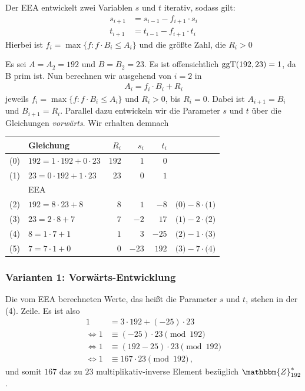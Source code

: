 Der EEA entwickelt zwei Variablen $s$ und $t$ iterativ, sodass gilt: 
    \begin{align*}
      s_{i+1} &= s_{i-1} - f_{i+1} \cdot s_{i}\\
      t_{i+1} &= t_{i-1} - f_{i+1} \cdot t_{i}
    \end{align*}
Hierbei ist $f_i = \max \{f : f \cdot B_i \leq A_i\}$ und die größte
Zahl, die  $R_i > 0$
  \begin{beispiel}[EEA]
    Es sei $A = A_2 = 192 $ und $B = B_2 = 23$. Es ist offensichtlich $\operatorname{ggT}(192, 23) = 1$, da B prim ist. Nun berechnen wir ausgehend von $i = 2$ in
    \begin{align*}
      A_i = f_i \cdot B_i + R_i
    \end{align*}
    jeweils $f_i = \max \{f : f \cdot B_i \leq A_i\}$ und $R_i > 0$, bis
    $R_i = 0$. Dabei ist $A_{i+1} = B_i$ und $B_{i+1} = R_i$. Parallel
    dazu entwickeln wir die Parameter $s$ und $t$ über die Gleichungen 
    \emph{vorwärts}. Wir erhalten demnach
    \begin{table}[h]
      \centering
      \large
      \begin{tabular}[c]{|c|l|rrr|l|}
        \hline
        & Gleichung & $R_i$ & $s_i$ & $t_i$ &\\
        \hline
        \hline
        (0) & $192 = 1 \cdot 192 + 0 \cdot 23$ & $192$ & $1$ & $0$ &\\
        (1) & $23 = 0 \cdot 192 + 1 \cdot 23$ & $23$ & $0$ & $1$ &\\
        \hline 
        & EEA & & & &\\
        \hline
        (2) & $192 = 8 \cdot 23 + 8$ & $8$ & $1$ & $-8$ & $\text{(0)} - 8 \cdot \text{(1)}$\\
        (3) & $23 =  2 \cdot 8 + 7$ & $7$ & $-2$ & $17$ & $\text{(1)} - 2 \cdot \text{(2)}$\\
        (4) & $8 = 1 \cdot 7 + 1$ & $1$ & $3$ & $-25$ & $\text{(2)} - 1 \cdot \text{(3)}$\\ 
        (5) & $7 = 7 \cdot 1 + 0$ & $0$ & $-23$ & $192$ & $\text{(3)} - 7 \cdot \text{(4)}$\\
        \hline
      \end{tabular}
    \end{table}
    \subsubsection*{Varianten 1: Vorwärts-Entwicklung}
    Die vom EEA berechneten Werte, das heißt die Parameter $s$ und $t$, stehen in der (4). Zeile. Es ist also 
    \begin{align*}
      1 &= 3 \cdot 192 + (-25) \cdot 23\\
      \Leftrightarrow 1 &\equiv (-25) \cdot 23 \pmod{192}\\
      \Leftrightarrow 1 &\equiv (192 - 25) \cdot 23 \pmod{192}\\ 
      \Leftrightarrow 1 &\equiv 167 \cdot 23 \pmod{192}\, \text{,}
    \end{align*}
    und somit $167$ das zu $23$ multiplikativ-inverse Element bezüglich
    $\mathbbm{Z}^{\ast}_{192}$.

\end{beispiel}
